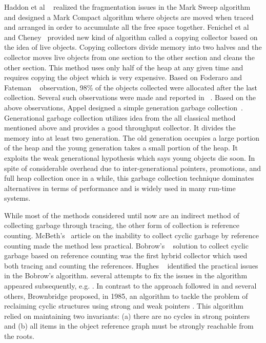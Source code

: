Haddon et al ~\cite{haddon} realized 
the fragmentation issues in the Mark Sweep algorithm and designed a Mark Compact algorithm where objects are moved when traced and arranged in order to accumulate all the free space together. Fenichel et al~\cite{feni} and Cheney~\cite{cheney}
provided new kind of algorithm called a copying collector based on the idea of live objects. Copying collectors divide memory into two halves and the collector moves live objects from one section to the other section and cleans the other section. This method uses only half of the heap at any given time and requires copying the object which is very expensive. Based on Foderaro and Fateman ~\cite{fode81} observation,  98\% of the objects collected were allocated after the last collection. Several such observations were made and reported in ~\cite{zorn89,sans93}. Based on the above observations, Appel  designed a simple generation garbage collection~\cite{Appel89}. Generational garbage collection utilizes idea from the all classical method mentioned above and provides a good throughput collector. It divides the memory into at least two generation. The old generation occupies a large portion of the heap and the young generation takes a small portion of the heap. It exploits the weak generational hypothesis which says young objects die soon. In spite of considerable overhead due to inter-generational pointers, promotions, and full heap collection once in a while, this garbage collection technique dominates alternatives in terms of performance and is widely used in many run-time systems.

While most of the methods considered until now are  an indirect method of collecting garbage through tracing, the other form of collection is reference counting. McBeth's~\cite{McBeth1963} article on the inability to collect cyclic garbage  by 
reference counting made the method less practical. Bobrow's ~\cite{Bobrow1980} solution to collect cyclic garbage based on reference counting was the first hybrid collector which used both tracing and
counting the references. Hughes ~\cite{hugh83,hugh87} identified the practical issues in the Bobrow's algorithm.
several attempts to fix the issues in the algorithm appeared subsequently, e.g. \cite{Friedman1979,Bobrow1980,Lins2008}. 
In contrast to the approach followed in \cite{Friedman1979,Bobrow1980,Lins2008} and several others,
Brownbridge \cite{Brownbridge1985} proposed, in 1985, an algorithm to tackle the problem of reclaiming cyclic  structures using strong and weak pointers \cite{Jones1996}. 
This algorithm relied on maintaining two invariants: (a) there are no cycles in strong pointers and (b) all items in the object reference graph must be strongly reachable from the roots.

